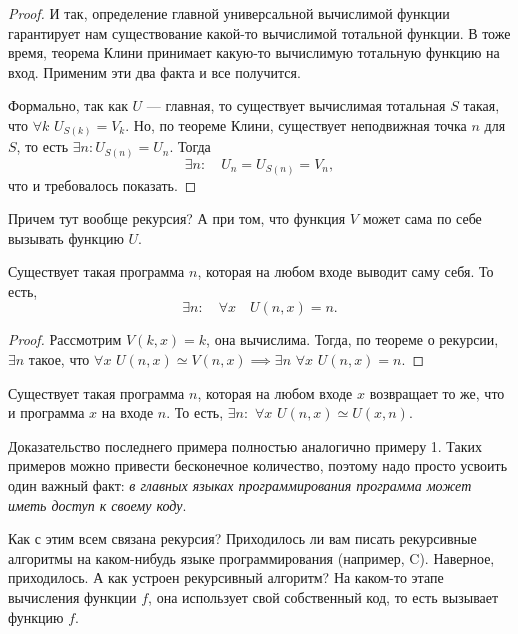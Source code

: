 \begin{proof}
    И так, определение главной универсальной вычислимой функции гарантирует нам существование какой-то вычислимой тотальной функции.
    В тоже время, теорема Клини принимает какую-то вычислимую тотальную функцию на вход.
    Применим эти два факта и все получится.

    Формально, так как $U$ --- главная, то существует вычислимая тотальная $S$ такая, что $\forall k$ $U_{S(k)} = V_{k}$.
    Но, по теореме Клини, существует неподвижная точка $n$ для $S$, то есть $\exists n: U_{S(n)} = U_{n}$.
    Тогда
    $$
        \exists n: \quad U_{n} = U_{S(n)} = V_{n},
    $$
    что и требовалось показать.
\end{proof}

Причем тут вообще рекурсия?
А при том, что функция $V$ может сама по себе вызывать функцию $U$.

\begin{example}
    Существует такая программа $n$, которая на любом входе выводит саму себя.
    То есть,
    $$
        \exists n: \quad \forall x \quad U(n, x) = n.
    $$
\end{example}
\begin{proof}
    Рассмотрим $V\left(k, x\right) = k$, она вычислима.
    Тогда, по теореме о рекурсии, $\exists n$ такое, что $\forall x$ $U(n, x) \simeq V(n, x) \implies \exists n$ $\forall x$ $U(n, x) = n$.
\end{proof}

\begin{example}
    Существует такая программа $n$, которая на любом входе $x$ возвращает то же, что и программа $x$ на входе $n$.
    То есть, $\exists n:$ $\forall x$ $U(n, x) \simeq U(x, n)$. 
\end{example}

Доказательство последнего примера полностью аналогично примеру 1.
Таких примеров можно привести бесконечное количество, поэтому надо просто усвоить один важный факт: {\it в главных языках программирования программа может иметь доступ к своему коду}.

Как с этим всем связана рекурсия?
Приходилось ли вам писать рекурсивные алгоритмы на каком-нибудь языке программирования (например, C).
Наверное, приходилось.
А как устроен рекурсивный алгоритм?
На каком-то этапе вычисления функции $f$, она использует свой собственный код, то есть вызывает функцию $f$.


